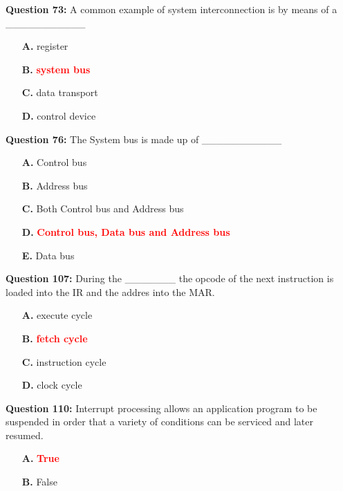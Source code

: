 \documentclass[12pt,a4paper]{article}
\begin{document}
\vspace{0.5cm}

\textbf{Question 73:} A common example of system interconnection is by means of a ___________

\begin{itemize}
    \item[\textbf{A.}] register
    \item[\textbf{B.}] \textcolor{red}{\textbf{system bus}}
    \item[\textbf{C.}] data transport
    \item[\textbf{D.}] control device
\end{itemize}

\vspace{0.5cm}

\textbf{Question 76:} The System bus is made up of ___________

\begin{itemize}
    \item[\textbf{A.}] Control bus
    \item[\textbf{B.}] Address bus
    \item[\textbf{C.}] Both Control bus and Address bus
    \item[\textbf{D.}] \textcolor{red}{\textbf{Control bus, Data bus and Address bus}}
    \item[\textbf{E.}] Data bus
\end{itemize}

\vspace{0.5cm}

\textbf{Question 107:} During the _______ the opcode of the next instruction is loaded into the IR and the addres into the MAR.

\begin{itemize}
    \item[\textbf{A.}] execute cycle
    \item[\textbf{B.}] \textcolor{red}{\textbf{fetch cycle}}
    \item[\textbf{C.}] instruction cycle
    \item[\textbf{D.}] clock cycle
\end{itemize}

\vspace{0.5cm}

\textbf{Question 110:} Interrupt processing allows an application program to be suspended in order that a variety of conditions can be serviced and later resumed.

\begin{itemize}
    \item[\textbf{A.}] \textcolor{red}{\textbf{True}}
    \item[\textbf{B.}] False
\end{itemize}
\end{document}
